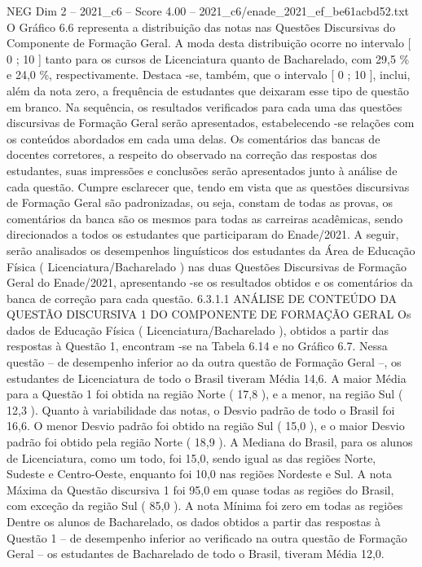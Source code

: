 \begin{textsample}{NEG Dim 2 – 2021\_c6 – Score 4.00 – 2021\_c6/enade\_2021\_ef\_be61acbd52.txt}
O Gráfico 6.6 representa a distribuição das notas nas Questões Discursivas do Componente de Formação Geral.
A moda desta distribuição ocorre no intervalo [ 0 ; 10 ] tanto para os cursos de Licenciatura quanto de Bacharelado, com 29,5 \% e 24,0 \%, respectivamente.
Destaca -se, também, que o intervalo [ 0 ; 10 ], inclui, além da nota zero, a frequência de estudantes que deixaram esse tipo de questão em branco.
Na sequência, os resultados verificados para cada uma das questões discursivas de Formação Geral serão apresentados, estabelecendo -se relações com os conteúdos abordados em cada uma delas.
Os comentários das bancas de docentes corretores, a respeito do observado na correção das respostas dos estudantes, suas impressões e conclusões serão apresentados junto à análise de cada questão.
Cumpre esclarecer que, tendo em vista que as questões discursivas de Formação Geral são padronizadas, ou seja, constam de todas as provas, os comentários da banca são os mesmos para todas as carreiras acadêmicas, sendo direcionados a todos os estudantes que participaram do Enade/2021.
A seguir, serão analisados os desempenhos linguísticos dos estudantes da Área de Educação Física ( Licenciatura/Bacharelado ) nas duas Questões Discursivas de Formação Geral do Enade/2021, apresentando -se os resultados obtidos e os comentários da banca de correção para cada questão. 6.3.1.1 ANÁLISE DE CONTEÚDO DA QUESTÃO DISCURSIVA 1 DO COMPONENTE DE FORMAÇÃO GERAL Os dados de Educação Física ( Licenciatura/Bacharelado ), obtidos a partir das respostas à Questão 1, encontram -se na Tabela 6.14 e no Gráfico 6.7.
Nessa questão – de desempenho inferior ao da outra questão de Formação Geral –, os estudantes de Licenciatura de todo o Brasil tiveram Média 14,6.
A maior Média para a Questão 1 foi obtida na região Norte ( 17,8 ), e a menor, na região Sul ( 12,3 ).
Quanto à variabilidade das notas, o Desvio padrão de todo o Brasil foi 16,6.
O menor Desvio padrão foi obtido na região Sul ( 15,0 ), e o maior Desvio padrão foi obtido pela região Norte ( 18,9 ).
A Mediana do Brasil, para os alunos de Licenciatura, como um todo, foi 15,0, sendo igual as das regiões Norte, Sudeste e Centro-Oeste, enquanto foi 10,0 nas regiões Nordeste e Sul.
A nota Máxima da Questão discursiva 1 foi 95,0 em quase todas as regiões do Brasil, com exceção da região Sul ( 85,0 ).
A nota Mínima foi zero em todas as regiões Dentre os alunos de Bacharelado, os dados obtidos a partir das respostas à Questão 1 – de desempenho inferior ao verificado na outra questão de Formação Geral – os estudantes de Bacharelado de todo o Brasil, tiveram Média 12,0.

\end{textsample}
